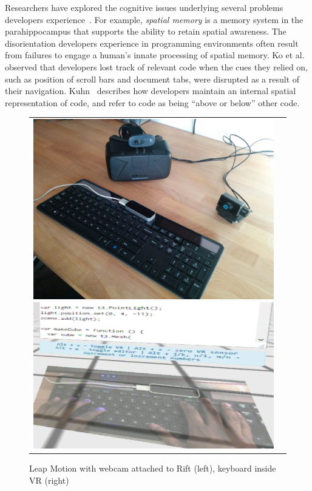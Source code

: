 \documentclass[conference]{IEEEtran}
\begin{document}
Researchers have explored the cognitive issues underlying several problems developers experience~\cite{Parnin:2012}.
For example, \emph{spatial memory} is a memory system in the parahippocampus that supports the ability to retain spatial awareness. 
The disorientation developers experience in programming environments often result from failures to engage a human's innate processing of spatial memory. 
Ko et al.~\cite{Ko:2006} observed that developers lost track of relevant code when the cues they relied on, such as position of scroll bars and document tabs, were disrupted as a result of their navigation.
Kuhn~\cite{Kuhn:2010} describes how developers maintain an internal spatial representation of code, and refer to code as being ``above or below'' other code.

\begin{figure}[ht]
\centering
\begin{tabular}{cc}
	\includegraphics[width=.45\linewidth]{figures/setup/equipment}\label{fig:rift}
 	\includegraphics[width=.45\linewidth]{figures/setup/webcam_passthrough}\label{fig:leap}
\end{tabular}
\caption{Leap Motion with webcam attached to Rift (left), keyboard inside VR (right)}
\end{figure}
\end{document}
